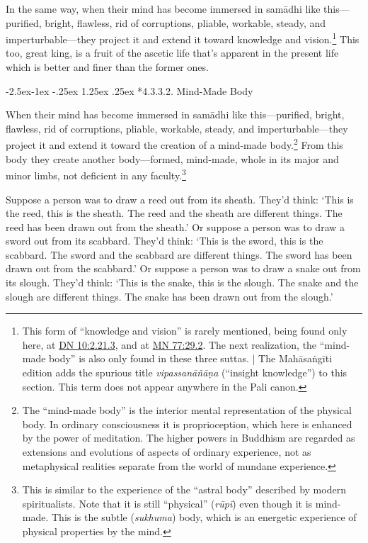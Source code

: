 \documentclass[12pt,openany]{book}%
\makeatletter
\renewcommand\paragraph{\@startsection{paragraph}{4}{\z@}%
            {-2.5ex\@plus -1ex \@minus -.25ex}%
            {1.25ex \@plus .25ex}%
            {\noindent\normalfont\itshape\small}}
\makeatother
\begin{document}
In the same way, when their mind has become immersed in \textsanskrit{samādhi} like this—purified, bright, flawless, rid of corruptions, pliable, workable, steady, and imperturbable—they project it and extend it toward knowledge and vision.\footnote{This form of “knowledge and vision” is rarely mentioned, being found only here, at \href{https://suttacentral.net/dn10/en/sujato\#2.21.3}{DN 10:2.21.3}, and at \href{https://suttacentral.net/mn77/en/sujato\#29.2}{MN 77:29.2}. The next realization, the “mind-made body” is also only found in these three suttas. | The \textsanskrit{Mahāsaṅgīti} edition adds the spurious title \textit{\textsanskrit{vipassanāñāṇa}} (“insight knowledge”) to this section. This term does not appear anywhere in the Pali canon. } This too, great king, is a fruit of the ascetic life that’s apparent in the present life which is better and finer than the former ones. 

\paragraph*{4.3.3.2. Mind-Made Body }

When their mind has become immersed in \textsanskrit{samādhi} like this—purified, bright, flawless, rid of corruptions, pliable, workable, steady, and imperturbable—they project it and extend it toward the creation of a mind-made body.\footnote{The “mind-made body” is the interior mental representation of the physical body. In ordinary consciousness it is proprioception, which here is enhanced by the power of meditation. The higher powers in Buddhism are regarded as extensions and evolutions of aspects of ordinary experience, not as metaphysical realities separate from the world of mundane experience. } From this body they create another body—formed, mind-made, whole in its major and minor limbs, not deficient in any faculty.\footnote{This is similar to the experience of the “astral body” described by modern spiritualists. Note that it is still “physical” (\textit{\textsanskrit{rūpī}}) even though it is mind-made. This is the subtle (\textit{sukhuma}) body, which is an energetic experience of physical properties by the mind. } 

Suppose a person was to draw a reed out from its sheath. They’d think: ‘This is the reed, this is the sheath. The reed and the sheath are different things. The reed has been drawn out from the sheath.’ Or suppose a person was to draw a sword out from its scabbard. They’d think: ‘This is the sword, this is the scabbard. The sword and the scabbard are different things. The sword has been drawn out from the scabbard.’ Or suppose a person was to draw a snake out from its slough. They’d think: ‘This is the snake, this is the slough. The snake and the slough are different things. The snake has been drawn out from the slough.’ 
\end{document}
